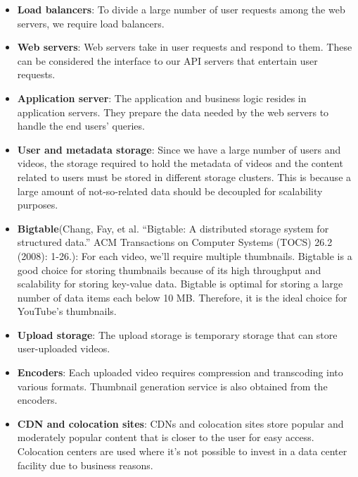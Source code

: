 \begin{itemize}
\item
\protect{}\label{cuM0hQC3CcuIHgjalO_p1}
\textbf{Load balancers}: To divide a large number of user requests among the web servers, we require load balancers.
\item
\protect{}\label{dRN3VpvZOzrg7ZvTdbFyQ}
\textbf{Web servers}: Web servers take in user requests and respond to them. These can be considered the interface to our API servers that entertain user requests.
\item
\protect{}\label{Jdl4pmiQVe6c1mFFG98yZ}
\textbf{Application server}: The application and business logic resides in application servers. They prepare the data needed by the web servers to handle the end users' queries.
\item
\protect{}\label{8OsxPpj5YI1prKZcxrN-2}
\textbf{User and metadata storage}: Since we have a large number of users and videos, the storage required to hold the metadata of videos and the content related to users must be stored in different storage clusters. This is because a large amount of not-so-related data should be decoupled for scalability purposes.
\item
\protect{}\label{s5toOaFup2wcVuKC3lEEn}
\textbf{Bigtable}(Chang, Fay, et al. ``Bigtable: A distributed storage system for structured data.'' ACM Transactions on Computer Systems (TOCS) 26.2 (2008): 1-26.): For each video, we'll require multiple thumbnails. Bigtable is a good choice for storing thumbnails because of its high throughput and scalability for storing key-value data. Bigtable is optimal for storing a large number of data items each below 10 MB. Therefore, it is the ideal choice for YouTube's thumbnails.
\item
\protect{}\label{Z4W6XQgrqXr-9Ky1qu6Ok}
\textbf{Upload storage}: The upload storage is temporary storage that can store user-uploaded videos.
\item
\protect{}\label{AmpS-MXSq0BqcTC-8t3vl}
\textbf{Encoders}: Each uploaded video requires compression and transcoding into various formats. Thumbnail generation service is also obtained from the encoders.
\item
\protect{}\label{e8jbwN11Mm0faKJdBHrTM}
\textbf{CDN and colocation sites}: CDNs and colocation sites store popular and moderately popular content that is closer to the user for easy access. Colocation centers are used where it's not possible to invest in a data center facility due to business reasons.
\end{itemize}

